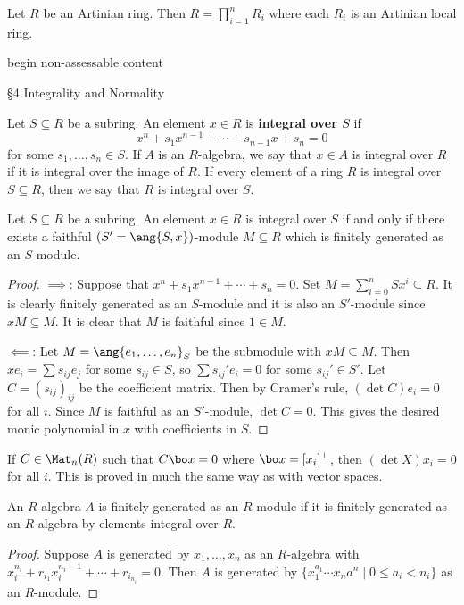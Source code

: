 \begin{thm}[3.37]
  Let $R$ be an Artinian ring.
  Then $R = \prod_{i=1}^n R_i$ where each $R_i$ is an Artinian local ring.  \end{thm}

begin non-assessable content

\S4 Integrality and Normality

\begin{defn}[4.1]
  Let $S \subseteq R$ be a subring.
  An element $x \in R$ is \textbf{integral over $S$} if
  \[ x^n + s_1x^{n-1} + \cdots + s_{n-1}x + s_n = 0 \]
  for some $s_1,\ldots,s_n \in S$.
  If $A$ is an $R$-algebra, we say that $x \in A$ is integral over $R$ if it is integral over the image of $R$.
  If every element of a ring $R$ is integral over $S \subseteq R$, then we say that $R$ is integral over $S$.
\end{defn}

\begin{prop}[4.2]
  Let $S \subseteq R$ be a subring.
  An element $x \in R$ is integral over $S$ if and only if there exists a faithful $(S'=\ang{S,x})$-module $M \subseteq R$ which is finitely generated as an $S$-module.
\end{prop}

\begin{proof}
  $\implies$:
  Suppose that $x^n+s_1x^{n-1}+\cdots+s_n=0$.
  Set $M=\sum_{i=0}^nSx^i \subseteq R$.
  It is clearly finitely generated as an $S$-module and it is also an $S'$-module since $xM \subseteq M$.
  It is clear that $M$ is faithful since $1 \in M$.

  $\impliedby$:
  Let $M=\ang{e_1,\ldots,e_n}_S$ be the submodule with $xM \subseteq M$.
  Then $xe_i = \sum s_{ij} e_j$ for some $s_{ij} \in S$, so $\sum s_{ij}'e_i=0$ for some $s_{ij}' \in S'$.
  Let $C=(s_{ij})_{ij}$ be the coefficient matrix.
  Then by Cramer's rule, $(\det C)e_i=0$ for all $i$.
  Since $M$ is faithful as an $S'$-module, $\det C=0$.
  This gives the desired monic polynomial in $x$ with coefficients in $S$.
\end{proof}

\begin{rmk}
  If $C \in \Mat_n(R)$ such that $C \bo x = 0$ where $\bo x = [x_i]^\perp$, then $(\det X)x_i=0$ for all $i$.
  This is proved in much the same way as with vector spaces.
\end{rmk}

\begin{prop}[4.3]
  An $R$-algebra $A$ is finitely generated as an $R$-module if it is finitely-generated as an $R$-algebra by elements integral over $R$.
\end{prop}

\begin{proof}
  Suppose $A$ is generated by $x_1,\ldots,x_n$ as an $R$-algebra with $x_i^{n_i}+r_{i_1}x_i^{n_i-1}+\cdots+r_{i_{n_i}}=0$.
  Then $A$ is generated by $\{ x_1^{a_1} \cdots x_na^n \mid 0 \leq a_i < n_i \}$ as an $R$-module.
\end{proof}
